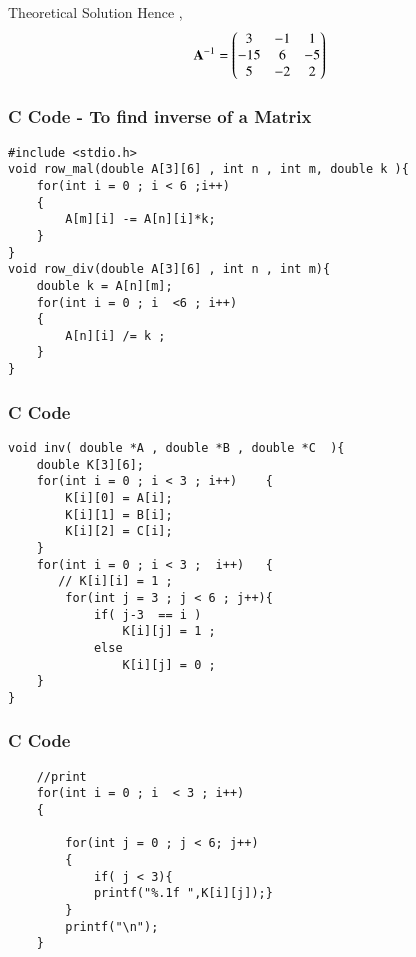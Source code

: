 \documentclass{beamer}
\begin{document}
\begin{frame}{Theoretical Solution}
Hence ,
\begin{align}
    \mathbf{A}^{-1} = \begin{pmatrix}3 & -1 & 1 \\ -15 & 6 & -5 \\ 5 & -2 & 2\end{pmatrix}
\end{align}
\end{frame}

\begin{frame}[fragile]
    \frametitle{C Code - To find inverse of a Matrix }
    \begin{lstlisting}
#include <stdio.h>
void row_mal(double A[3][6] , int n , int m, double k ){
	for(int i = 0 ; i < 6 ;i++)
	{
		A[m][i] -= A[n][i]*k; 
	}
}
void row_div(double A[3][6] , int n , int m){
	double k = A[n][m]; 
	for(int i = 0 ; i  <6 ; i++)
	{
		A[n][i] /= k ;
	}
}

    \end{lstlisting}
\end{frame}

\begin{frame}[fragile]
    \frametitle{C Code  }
    \begin{lstlisting}
void inv( double *A , double *B , double *C  ){
	double K[3][6]; 
	for(int i = 0 ; i < 3 ; i++)	{
		K[i][0] = A[i]; 
		K[i][1] = B[i];
		K[i][2] = C[i];
	}
	for(int i = 0 ; i < 3 ;  i++)	{
	   // K[i][i] = 1 ;
		for(int j = 3 ; j < 6 ; j++){
			if( j-3  == i )
				K[i][j] = 1 ;
			else
				K[i][j] = 0 ; 
	}
}
\end{lstlisting}
\end{frame}
\begin{frame}[fragile]
    \frametitle{C Code  }
    \begin{lstlisting}
	//print
	for(int i = 0 ; i  < 3 ; i++)
	{
	    
		for(int j = 0 ; j < 6; j++)
		{
		    if( j < 3){
			printf("%.1f ",K[i][j]);}
		}
		printf("\n");
	}	
\end{lstlisting}
\end{frame}
\end{document}
